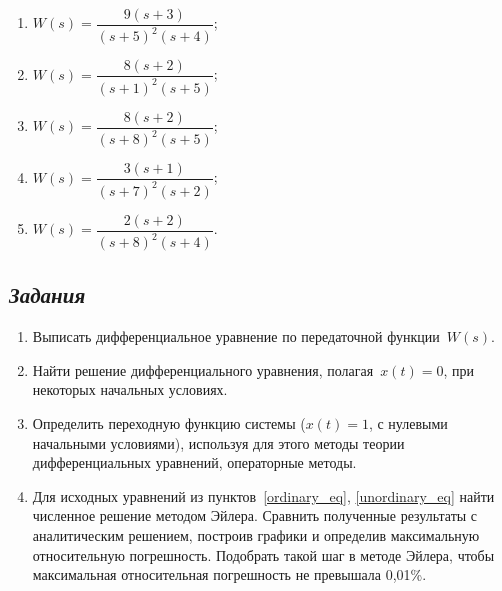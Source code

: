 \documentclass[a4paper,oneside,10pt]{book}
\theoremstyle{definition}
\begin{document}
\begin{multicols}{2}
\begin{enumerate}
		\item

		      $ 	W(s) =
			      \dfrac{9(s+3)}
			      {(s+5)^2(s+4)} $;

		\item

		      $ W(s) =
			      \dfrac{8(s+2)}
			      {(s+1)^2(s+5)} $;

		\item

		      $ W(s) =
			      \dfrac{8(s+2)}
			      {(s+8)^2(s+5)} $;

		\item

		      $ W(s) =
			      \dfrac{3(s+1)}
			      {(s+7)^2(s+2)} $;

		\item

		      $ W(s) =
			      \dfrac{2(s+2)}
			      {(s+8)^2(s+4)} $.

	\end{enumerate}
\end{multicols}


\subsection*{\textit{Задания}}

\begin{enumerate}
	\item
	      Выписать дифференциальное уравнение по передаточной функции~$ W(s) $.
	\item \label{ordinary_eq}
	      Найти решение дифференциального уравнения, полагая~$ x(t) = 0 $, при некоторых начальных условиях.
	\item \label{unordinary_eq}
	      Определить переходную функцию системы ($ x(t) =1 $, с нулевыми начальными условиями), используя для этого методы теории дифференциальных уравнений, операторные методы.
	\item
	      Для исходных уравнений из пунктов~\ref{ordinary_eq}, \ref{unordinary_eq} найти численное решение методом Эйлера. Сравнить полученные результаты с аналитическим решением, построив графики и определив максимальную относительную погрешность.  Подобрать такой шаг в методе Эйлера, чтобы максимальная относительная погрешность не превышала 0,01\%.


\end{enumerate}
\end{document}
